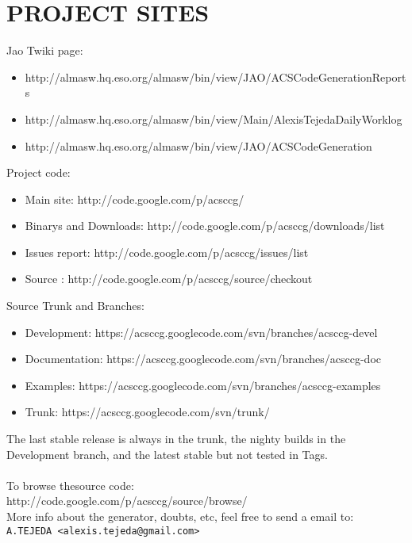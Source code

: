\newpage
\section{PROJECT SITES}

Jao Twiki page:
\begin{itemize}
	\item http://almasw.hq.eso.org/almasw/bin/view/JAO/ACSCodeGenerationReports
	\item http://almasw.hq.eso.org/almasw/bin/view/Main/AlexisTejedaDailyWorklog
	\item http://almasw.hq.eso.org/almasw/bin/view/JAO/ACSCodeGeneration
\end{itemize}

Project code:
\begin{itemize}
	\item Main site: http://code.google.com/p/acsccg/
	\item Binarys and Downloads: http://code.google.com/p/acsccg/downloads/list
	\item Issues report: http://code.google.com/p/acsccg/issues/list
	\item Source : http://code.google.com/p/acsccg/source/checkout
\end{itemize}
 
 Source Trunk and Branches:
 \begin{itemize}
	\item Development: https://acsccg.googlecode.com/svn/branches/acsccg-devel
	\item Documentation: https://acsccg.googlecode.com/svn/branches/acsccg-doc
	\item Examples:  https://acsccg.googlecode.com/svn/branches/acsccg-examples
	\item Trunk: https://acsccg.googlecode.com/svn/trunk/
\end{itemize}

The last stable release is always in the trunk, the nighty builds in the
Development branch, and the latest stable but not tested in Tags.\\
\\To browse thesource code:
\\
http://code.google.com/p/acsccg/source/browse/
\\

More info about the generator, doubts, etc, feel free to send a email to:\\
\verb+A.TEJEDA <alexis.tejeda@gmail.com>+
